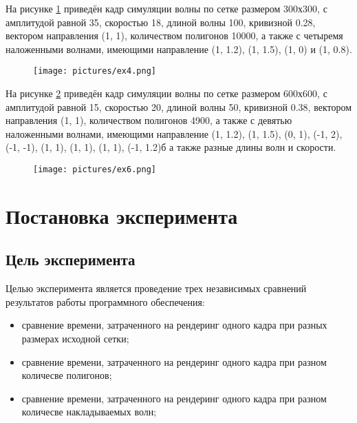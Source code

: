 На рисунке \ref{ex4} приведён кадр симуляции волны по сетке размером 300х300, с амплитудой равной 35, скоростью 18, длиной волны 100, кривизной 0.28, вектором направления (1, 1), количеством полигонов 10000, а также с четыремя наложенными волнами, имеющими направление (1, 1.2), (1, 1.5), (1, 0) и (1, 0.8).

\begin{figure}[H]
	\begin{center}
		\texttt{[image: pictures/ex4.png]}
	\end{center}
	\captionsetup{justification=centering}
	\caption{}
	\label{ex4}
\end{figure}

На рисунке \ref{ex6} приведён кадр симуляции волны по сетке размером 600х600, с амплитудой равной 15, скоростью 20, длиной волны 50, кривизной 0.38, вектором направления (1, 1), количеством полигонов 4900, а также с девятью наложенными волнами, имеющими направление (1, 1.2), (1, 1.5), (0, 1), (-1, 2), (-1, -1), (1, 1), (1, 1), (1, 1), (-1, 1.2)б а также разные длины волн и скорости.

\begin{figure}[H]
	\begin{center}
		\texttt{[image: pictures/ex6.png]}
	\end{center}
	\captionsetup{justification=centering}
	\caption{}
	\label{ex6}
\end{figure}

\newpage

\section{Постановка эксперимента}

\subsection{Цель эксперимента}


Целью эксперимента является проведение трех независимых сравнений результатов работы программного обеспечения:

\begin{itemize}
	\item сравнение времени, затраченного на рендеринг одного кадра при разных размерах исходной сетки;
	\item сравнение времени, затраченного на рендеринг одного кадра при разном количесве полигонов;
	\item сравнение времени, затраченного на рендеринг одного кадра при разном количесве накладываемых волн;
\end{itemize}


